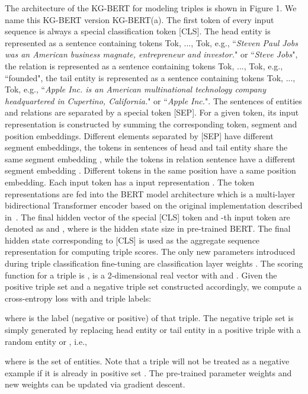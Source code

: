 \documentclass[letterpaper]{article} \usepackage{aaai20}  \usepackage{times}  \usepackage{helvet} \usepackage{courier}  \usepackage[hyphens]{url}  \usepackage{graphicx} \urlstyle{rm} \def\UrlFont{\rm}  \usepackage{graphicx}  \usepackage{amsmath}
\begin{document}
The architecture of the KG-BERT for modeling triples is shown in Figure 1. We name this KG-BERT version KG-BERT(a).
The first token of every input sequence is always a special classification token [CLS]. The head entity is represented as a sentence containing tokens Tok, ..., Tok, e.g., ``\textit{Steven Paul Jobs was an American business magnate, entrepreneur and investor.}" or ``\textit{Steve Jobs}", the relation is represented as a sentence containing tokens Tok, ..., Tok, e.g., ``founded", the tail entity is represented as a sentence containing tokens Tok, ..., Tok, e.g., ``\textit{Apple Inc. is an American multinational technology company headquartered in Cupertino, California.}" or ``\textit{Apple Inc.}".  The sentences of entities and relations are separated by a special token [SEP]. For a given token, its input representation is constructed by summing the corresponding token, segment and position embeddings. Different elements separated by [SEP] have different segment embeddings, the tokens in sentences of head and tail entity share the same segment embedding , while the tokens in relation sentence have a different segment embedding . Different tokens in the same position  have a same position embedding. Each input token  has a input representation . The token representations are fed into the BERT model architecture which is a multi-layer bidirectional Transformer encoder based on the original implementation described in~\cite{vaswani2017attention}. The final hidden vector of the special [CLS] token and -th input token are denoted as  and , where  is the hidden state size in pre-trained BERT. The final hidden state  corresponding to [CLS] is used as the aggregate sequence representation for computing triple scores. The only new parameters introduced during triple classification fine-tuning are classification layer weights . The scoring function for a triple  is ,  is a 2-dimensional real vector with  and . Given the positive triple set  and a negative triple set  constructed accordingly, we compute a cross-entropy loss with  and triple labels:


where  is the label (negative or positive) of that triple. The negative triple set  is simply generated by replacing head entity  or tail entity  in a positive triple  with a random entity  or , i.e., 

where  is the set of entities. Note that a triple will not be treated as a negative example if it is already in positive set . The pre-trained parameter weights and new weights  can be updated via gradient descent. 
 
\end{document}
